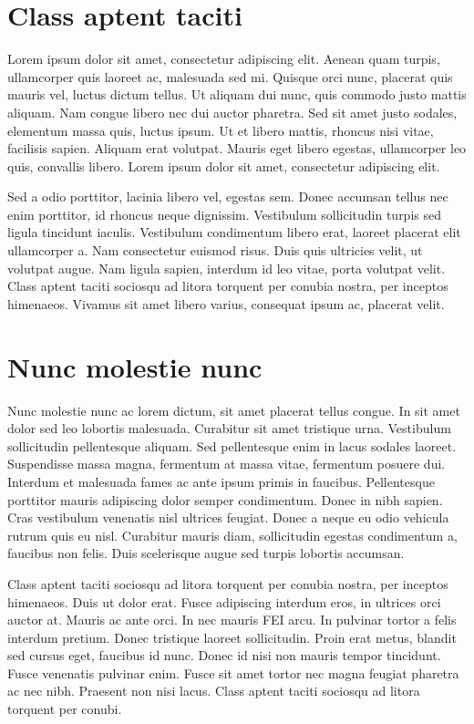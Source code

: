 \section{Class aptent taciti}

Lorem ipsum dolor sit amet, consectetur adipiscing elit. Aenean quam turpis, ullamcorper quis laoreet ac, malesuada sed mi. Quisque orci nunc, placerat quis mauris vel, luctus dictum tellus. Ut aliquam dui nunc, quis commodo justo mattis aliquam. Nam congue libero nec dui auctor pharetra. Sed sit amet justo sodales, elementum massa quis, luctus ipsum. Ut et libero mattis, rhoncus nisi vitae, facilisis sapien. Aliquam erat volutpat. Mauris eget libero egestas, ullamcorper leo quis, convallis libero. Lorem ipsum dolor sit amet, consectetur adipiscing elit.

Sed a odio porttitor, lacinia libero vel, egestas sem. Donec accumsan tellus nec enim porttitor, id rhoncus neque dignissim. Vestibulum sollicitudin turpis sed ligula tincidunt iaculis. Vestibulum condimentum libero erat, laoreet placerat elit ullamcorper a. Nam consectetur euismod risus. Duis quis ultricies velit, ut volutpat augue. Nam ligula sapien, interdum id leo vitae, porta volutpat velit. Class aptent taciti sociosqu ad litora torquent per conubia nostra, per inceptos himenaeos. Vivamus sit amet libero varius, consequat ipsum ac, placerat velit.

\section{Nunc molestie nunc}

Nunc molestie nunc ac lorem dictum, sit amet placerat tellus congue. In sit amet dolor sed leo lobortis malesuada. Curabitur sit amet tristique urna. Vestibulum sollicitudin pellentesque aliquam. Sed pellentesque enim in lacus sodales laoreet. Suspendisse massa magna, fermentum at massa vitae, fermentum posuere dui. Interdum et malesuada fames ac ante ipsum primis in faucibus. Pellentesque porttitor mauris adipiscing dolor semper condimentum. Donec in nibh sapien. Cras vestibulum venenatis nisl ultrices feugiat. Donec a neque eu odio vehicula rutrum quis eu nisl. Curabitur mauris diam, sollicitudin egestas condimentum a, faucibus non felis. Duis scelerisque augue sed turpis lobortis accumsan.

Class aptent taciti sociosqu ad litora torquent per conubia nostra, per inceptos himenaeos. Duis ut dolor erat. Fusce adipiscing interdum eros, in ultrices orci auctor at. Mauris ac ante orci. In nec mauris FEI arcu. In pulvinar tortor a felis interdum pretium. Donec tristique laoreet sollicitudin. Proin erat metus, blandit sed cursus eget, faucibus id nunc. Donec id nisi non mauris tempor tincidunt. Fusce venenatis pulvinar enim. Fusce sit amet tortor nec magna feugiat pharetra ac nec nibh. Praesent non nisi lacus. Class aptent taciti sociosqu ad litora torquent per conubi.

